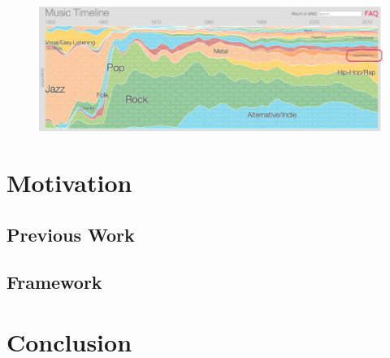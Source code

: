 \documentclass[12pt]{dalcsthesis}
\begin{document}
\begin{figure}[h]
\includegraphics[scale=.49]{genre_graph}
\centering
\end{figure}

\chapter{Motivation}

\section{Previous Work}

\section{Framework}

\chapter{Conclusion}



\end{document}
